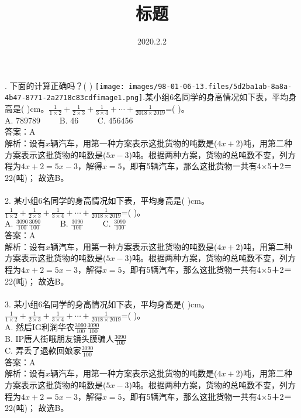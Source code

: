 \documentclass [UTF8]{ctexart}
\begin{document}
\title{标题}
\date{2020.2.2}
. 下面的计算正确吗？(  ) \quad\texttt{[image: images/98-01-06-13.files/5d2ba1ab-8a8a-4b47-8771-2a2718c83cdfimage1.png]}.某小组6名同学的身高情况如下表，平均身高是( )cm。\( \displaystyle \frac{1}{1\times 2}+\frac{1}{2\times 3}+\frac{1}{3\times 4}+\cdots +\frac{1}{2018\times 2019}\)=( )。\\
A. 789789　　 B. 46　　 C. 456456\\
答案：A\\
解析：设有\( x\)辆汽车，用第一种方案表示这批货物的吨数是(\( 4x+2\))吨，用第二种方案表示这批货物的吨数是(\( 5x-3\))吨。根据两种方案，货物的总吨数不变，列方程为\( 4x+2=5x-3\)，解得\( x=5\)，即有5辆汽车，那么这批货物一共有4×5＋2＝22(吨)； 故选B。\\
\\
2. 某小组6名同学的身高情况如下表，平均身高是( )cm。\( \displaystyle \frac{1}{1\times 2}+\frac{1}{2\times 3}+\frac{1}{3\times 4}+\cdots +\frac{1}{2018\times 2019}\)=( )。\\
A. \( \frac{3090}{100}\)\( \frac{3090}{100}\)　　 B. \( \frac{3090}{100}\)　　 C. \( \frac{3090}{100}\)\\
答案：A\\
解析：设有\( x\)辆汽车，用第一种方案表示这批货物的吨数是(\( 4x+2\))吨，用第二种方案表示这批货物的吨数是(\( 5x-3\))吨。根据两种方案，货物的总吨数不变，列方程为\( 4x+2=5x-3\)，解得\( x=5\)，即有5辆汽车，那么这批货物一共有4×5＋2＝22(吨)； 故选B。\\
\\
3. 某小组6名同学的身高情况如下表，平均身高是( )cm。\( \displaystyle \frac{1}{1\times 2}+\frac{1}{2\times 3}+\frac{1}{3\times 4}+\cdots +\frac{1}{2018\times 2019}\)=( )。\\
A. 然后IG利润华农\( \frac{3090}{100}\)\( \frac{3090}{100}\)　　 \\
B. IP唐人街哦朋友镜头膜骗人\( \frac{3090}{100}\)　　 \\
C. 弄丢了退款回娘家\( \frac{3090}{100}\)\\
答案：A\\
解析：设有\( x\)辆汽车，用第一种方案表示这批货物的吨数是(\( 4x+2\))吨，用第二种方案表示这批货物的吨数是(\( 5x-3\))吨。根据两种方案，货物的总吨数不变，列方程为\( 4x+2=5x-3\)，解得\( x=5\)，即有5辆汽车，那么这批货物一共有4×5＋2＝22(吨)； 故选B。\\
\\
 
\end{document}
